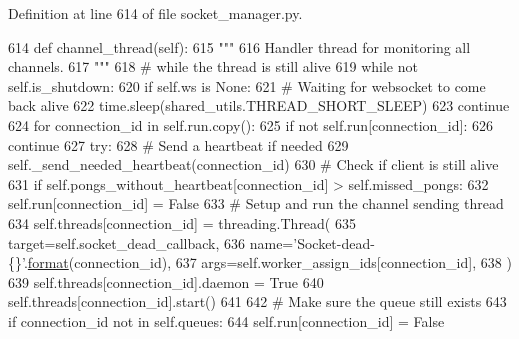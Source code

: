 Definition at line 614 of file socket\+\_\+manager.\+py.


\begin{DoxyCode}
614     \textcolor{keyword}{def }channel\_thread(self):
615         \textcolor{stringliteral}{"""}
616 \textcolor{stringliteral}{        Handler thread for monitoring all channels.}
617 \textcolor{stringliteral}{        """}
618         \textcolor{comment}{# while the thread is still alive}
619         \textcolor{keywordflow}{while} \textcolor{keywordflow}{not} self.is\_shutdown:
620             \textcolor{keywordflow}{if} self.ws \textcolor{keywordflow}{is} \textcolor{keywordtype}{None}:
621                 \textcolor{comment}{# Waiting for websocket to come back alive}
622                 time.sleep(shared\_utils.THREAD\_SHORT\_SLEEP)
623                 \textcolor{keywordflow}{continue}
624             \textcolor{keywordflow}{for} connection\_id \textcolor{keywordflow}{in} self.run.copy():
625                 \textcolor{keywordflow}{if} \textcolor{keywordflow}{not} self.run[connection\_id]:
626                     \textcolor{keywordflow}{continue}
627                 \textcolor{keywordflow}{try}:
628                     \textcolor{comment}{# Send a heartbeat if needed}
629                     self.\_send\_needed\_heartbeat(connection\_id)
630                     \textcolor{comment}{# Check if client is still alive}
631                     \textcolor{keywordflow}{if} self.pongs\_without\_heartbeat[connection\_id] > self.missed\_pongs:
632                         self.run[connection\_id] = \textcolor{keyword}{False}
633                         \textcolor{comment}{# Setup and run the channel sending thread}
634                         self.threads[connection\_id] = threading.Thread(
635                             target=self.socket\_dead\_callback,
636                             name=\textcolor{stringliteral}{'Socket-dead-\{\}'}.\hyperlink{namespaceparlai_1_1chat__service_1_1services_1_1messenger_1_1shared__utils_a32e2e2022b824fbaf80c747160b52a76}{format}(connection\_id),
637                             args=self.worker\_assign\_ids[connection\_id],
638                         )
639                         self.threads[connection\_id].daemon = \textcolor{keyword}{True}
640                         self.threads[connection\_id].start()
641 
642                     \textcolor{comment}{# Make sure the queue still exists}
643                     \textcolor{keywordflow}{if} connection\_id \textcolor{keywordflow}{not} \textcolor{keywordflow}{in} self.queues:
644                         self.run[connection\_id] = \textcolor{keyword}{False}

\end{DoxyCode}
